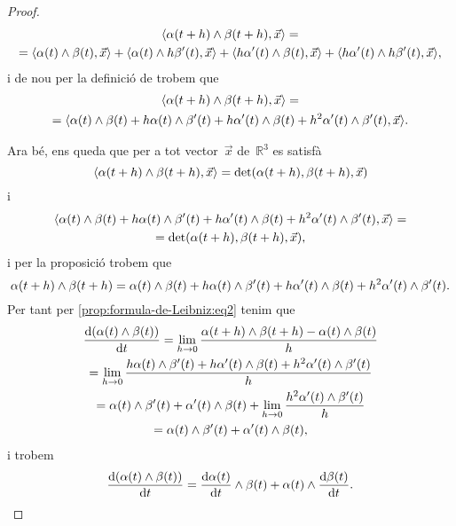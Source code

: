 \documentclass[../geometria-diferencial.tex]{subfiles}
\begin{document}
\begin{proof}
\begin{multline*}
            \prodesc{\alpha(t+h)\prodvec\beta(t+h)}{\vec{x}}=\\
            =\prodesc{\alpha(t)\prodvec\beta(t)}{\vec{x}}+\prodesc{\alpha(t)\prodvec h\beta'(t)}{\vec{x}}+\prodesc{h\alpha'(t)\prodvec\beta(t)}{\vec{x}}+\prodesc{h\alpha'(t)\prodvec h\beta'(t)}{\vec{x}},
        \end{multline*}
        i de nou per la definició de  trobem que
        \begin{multline*}
            \prodesc{\alpha(t+h)\prodvec\beta(t+h)}{\vec{x}}=\\
            =\prodesc{\alpha(t)\prodvec\beta(t)+h\alpha(t)\prodvec\beta'(t)+h\alpha'(t)\prodvec\beta(t)+h^{2}\alpha'(t)\prodvec \beta'(t)}{\vec{x}}.
        \end{multline*}

        Ara bé, ens queda que per a tot vector~\(\vec{x}\) de~\(\mathbb{R}^{3}\) es satisfà
        \[
            \prodesc{\alpha(t+h)\prodvec\beta(t+h)}{\vec{x}}=\det(\alpha(t+h),\beta(t+h),\vec{x})
        \]
        i
        \begin{multline*}
            \prodesc{\alpha(t)\prodvec\beta(t)+h\alpha(t)\prodvec\beta'(t)+h\alpha'(t)\prodvec\beta(t)+h^{2}\alpha'(t)\prodvec \beta'(t)}{\vec{x}}=\\=\det(\alpha(t+h),\beta(t+h),\vec{x}),
        \end{multline*}
        i per la proposició  trobem que
        \[
            \alpha(t+h)\mathbin{\wedge}\beta(t+h)=\alpha(t)\mathbin{\wedge}\beta(t)+h\alpha(t)\mathbin{\wedge}\beta'(t)+h\alpha'(t)\mathbin{\wedge}\beta(t)+h^{2}\alpha'(t)\mathbin{\wedge} \beta'(t).
        \]
        Per tant per \eqref{prop:formula-de-Leibniz:eq2} tenim que
        \begin{multline*}
            \frac{\mathop{}\!\mathrm{d}(\alpha(t)\mathbin{\wedge}\beta(t))}{\mathop{}\!\mathrm{d} t}=\lim_{h\to0}\frac{\alpha(t+h)\mathbin{\wedge}\beta(t+h)-\alpha(t)\mathbin{\wedge}\beta(t)}{h}\\
            =\lim_{h\to0}\frac{h\alpha(t)\mathbin{\wedge}\beta'(t)+h\alpha'(t)\mathbin{\wedge}\beta(t)+h^{2}\alpha'(t)\mathbin{\wedge} \beta'(t)}{h}\\
            =\alpha(t)\mathbin{\wedge}\beta'(t)+\alpha'(t)\mathbin{\wedge}\beta(t)+\lim_{h\to0}\frac{h^{2}\alpha'(t)\mathbin{\wedge} \beta'(t)}{h}\\
            =\alpha(t)\mathbin{\wedge}\beta'(t)+\alpha'(t)\mathbin{\wedge}\beta(t),
        \end{multline*}
        i trobem
        \[
            \frac{\mathop{}\!\mathrm{d}(\alpha(t)\mathbin{\wedge}\beta(t))}{\mathop{}\!\mathrm{d} t}=\frac{\mathop{}\!\mathrm{d}\alpha(t)}{\mathop{}\!\mathrm{d} t}\mathbin{\wedge}\beta(t)+\alpha(t)\mathbin{\wedge}\frac{\mathop{}\!\mathrm{d}\beta(t)}{\mathop{}\!\mathrm{d} t}.\qedhere
        \]
    \end{proof}
\end{document}
